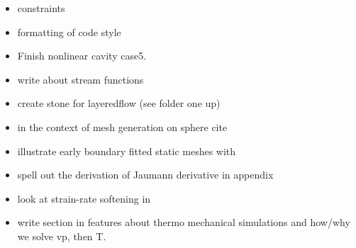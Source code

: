 \begin{itemize}
\begin{itemize}
\item constraints \cite{absh79}
\item formatting of code style
\item Finish nonlinear cavity case5.
\item write about stream functions 
\item create stone for layeredflow (see folder one up)
\item in the context of mesh generation on sphere cite \cite{moma19}
\item illustrate early boundary fitted static meshes with \cite{thar85}
\item \cite{bepo10} spell out the derivation of Jaumann derivative in appendix
\item look at strain-rate softening in \cite{belz02}
\item write section in features about thermo mechanical simulations and how/why we solve vp, then T.
\end{itemize}



\end{itemize}
